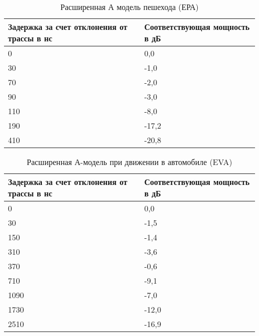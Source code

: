 
\begin{table} [htb]
  \centering
\parbox{15cm}{\caption{Расширенная А модель пешехода (ЕРА)}\label{EPA}}
\begin{tabular}{|p{7cm}|p{7cm}|}
    \hline
    \hline
    Задержка за счет отклонения от трассы в нс &  Соответствующая мощность в дБ \\ \hline \hline
    0                                     & 0,0                           \\ \hline
    30                                    & -1,0                          \\ \hline
    70                                    & -2,0                          \\ \hline
    90                                    & -3,0                          \\ \hline
    110                                   & -8,0                          \\ \hline
    190                                   & -17,2                         \\ \hline
    410                                   & -20,8                         \\ \hline
    \end{tabular}

\end{table}

\begin{table} [htb]
  \centering
\parbox{15cm}{\caption{Расширенная А-модель при движении в автомобиле (EVA)}\label{EVA}}
\begin{tabular}{|p{7cm}|p{7cm}|}
    \hline
    \hline
    Задержка за счет отклонения от трассы в нс &  Соответствующая мощность в дБ \\ \hline \hline
    0                                          & 0,0                           \\ \hline
    30                                         & -1,5                          \\ \hline
    150                                        & -1,4                          \\ \hline
    310                                        & -3,6                          \\ \hline
    370                                        & -0,6                          \\ \hline
    710                                        & -9,1                          \\ \hline
    1090                                       & -7,0                          \\ \hline
    1730                                       & -12,0                         \\ \hline
    2510                                       & -16,9                         \\ \hline
    \end{tabular}
\end{table}
\FloatBarrier

